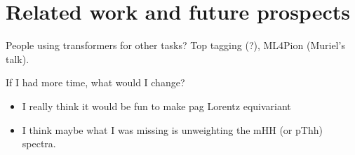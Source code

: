 \section{Related work and future prospects}


People using transformers for other tasks? Top tagging (?), ML4Pion (Muriel's talk).

If I had more time, what would I change?

\begin{itemize}
\item I really think it would be fun to make pag Lorentz equivariant
\item I think maybe what I was missing is unweighting the mHH (or pThh) spectra.
\end{itemize}